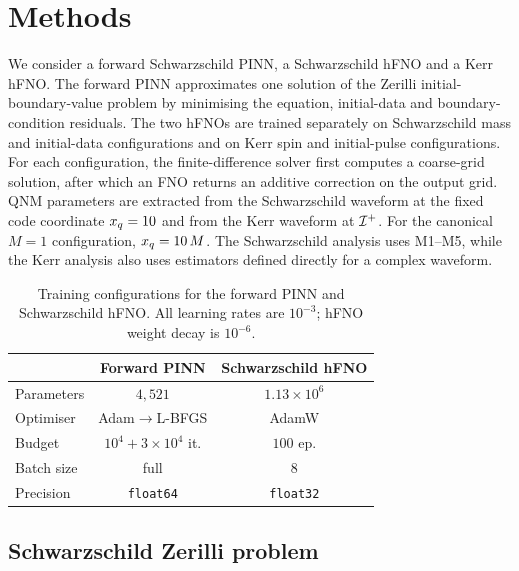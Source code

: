 ﻿%
\section{Methods}\label{sec:methods}

We consider a forward Schwarzschild PINN, a Schwarzschild hFNO and a
Kerr hFNO. The forward PINN approximates one solution of the Zerilli
initial-boundary-value problem by minimising the equation, initial-data
and boundary-condition residuals. The two hFNOs are trained separately
on Schwarzschild mass and initial-data configurations and on Kerr spin
and initial-pulse configurations. For each configuration, the
finite-difference solver first computes a coarse-grid solution, after
which an FNO returns an additive correction on the output grid. QNM
parameters are extracted from the Schwarzschild waveform at the fixed
code coordinate $x_{q}=10$ and from the Kerr waveform at $\mathcal{I}^{+}$.
For the canonical $M=1$ configuration, $x_{q}=10\,M$. The Schwarzschild
analysis uses M1--M5, while the Kerr analysis also uses estimators
defined directly for a complex waveform.

\begin{table}[!htbp]
\centering
\caption{Training configurations for the forward PINN and
Schwarzschild hFNO. All learning rates are $10^{-3}$; hFNO weight
decay is $10^{-6}$.}
\label{tab:train-config}
\footnotesize
\setlength{\tabcolsep}{5pt}
\begin{tabular}{@{}lcc@{}}
\toprule
 & Forward PINN & Schwarzschild hFNO \\
\midrule
Parameters & $4{,}521$ & $1.13\times 10^{6}$ \\
Optimiser  & Adam${\to}$L-BFGS & AdamW \\
Budget     & $10^{4} + 3{\times}10^{4}$ it. & $100$ ep. \\
Batch size & full & $8$ \\
Precision  & \texttt{float64} & \texttt{float32} \\
\bottomrule
\end{tabular}
\end{table}

\subsection{Schwarzschild Zerilli problem}
\label{sec:fwd-problem}

